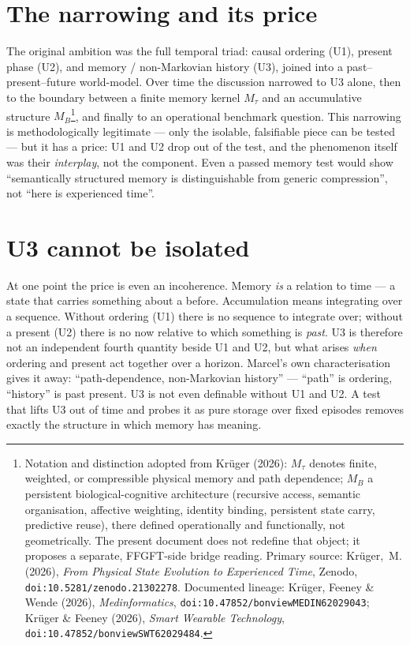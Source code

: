 \section{The narrowing and its price}

The original ambition was the full temporal triad: causal ordering (U1), present phase
(U2), and memory / non-Markovian history (U3), joined into a past--present--future
world-model. Over time the discussion narrowed to U3 alone, then to the boundary between a
finite memory kernel $M_\tau$ and an accumulative structure $M_B$\footnote{Notation and
distinction adopted from Krüger (2026): $M_\tau$ denotes finite, weighted, or compressible
physical memory and path dependence; $M_B$ a persistent biological-cognitive architecture
(recursive access, semantic organisation, affective weighting, identity binding, persistent
state carry, predictive reuse), there defined operationally and functionally, not
geometrically. The present document does not redefine that object; it proposes a separate,
FFGFT-side bridge reading. Primary source: Krüger,~M. (2026), \emph{From Physical State
Evolution to Experienced Time}, Zenodo, \texttt{doi:10.5281/zenodo.21302278}. Documented
lineage: Krüger, Feeney \& Wende (2026), \emph{Medinformatics},
\texttt{doi:10.47852/bonviewMEDIN62029043}; Krüger \& Feeney (2026), \emph{Smart Wearable
Technology}, \texttt{doi:10.47852/bonviewSWT62029484}.}, and finally to an
operational benchmark question. This narrowing is methodologically legitimate --- only the
isolable, falsifiable piece can be tested --- but it has a price: U1 and U2 drop out of the
test, and the phenomenon itself was their \emph{interplay}, not the component. Even a passed
memory test would show \enquote{semantically structured memory is distinguishable from
generic compression}, not \enquote{here is experienced time}.

\section{U3 cannot be isolated}

At one point the price is even an incoherence. Memory \emph{is} a relation to time --- a
state that carries something about a before. Accumulation means integrating over a
sequence. Without ordering (U1) there is no sequence to integrate over; without a present
(U2) there is no now relative to which something is \emph{past}. U3 is therefore not an
independent fourth quantity beside U1 and U2, but what arises \emph{when} ordering and
present act together over a horizon. Marcel's own characterisation gives it away:
\enquote{path-dependence, non-Markovian history} --- \enquote{path} is ordering,
\enquote{history} is past present. U3 is not even definable without U1 and U2. A test that
lifts U3 out of time and probes it as pure storage over fixed episodes removes exactly the
structure in which memory has meaning.

